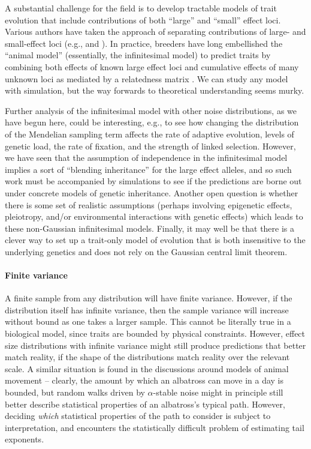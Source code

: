 \documentclass{article}
\newcommand{\1}{\mathbbm{1}}
\theoremstyle{remark}
\theoremstyle{definition}
\begin{document}
A substantial challenge for the field is to develop tractable models of trait evolution
that include contributions of both ``large'' and ``small'' effect loci.
Various authors have taken the approach of separating contributions of large- and small-effect loci
(e.g., \citet{lande1983response} and \citet{chevin2008selective}). 
In practice, breeders have long embellished the ``animal model'' (essentially, the infinitesimal model)
to predict traits
by combining both effects of known large effect loci
and cumulative effects of many unknown loci as mediated by a relatedness matrix
\citep[e.g.,][]{fernando1989marker,teissier2018weighted,bernardo2014genomewide,rice2019evaluation}.
We can study any model with simulation,
but the way forwards to theoretical understanding seems murky.

Further analysis of the infinitesimal model with other noise distributions,
as we have begun here,
could be interesting,
e.g., to see how changing the distribution of the Mendelian sampling term
affects the rate of adaptive evolution,
levels of genetic load,
the rate of fixation,
and the strength of linked selection.
However,
we have seen that the assumption of independence in the infinitesimal model
implies a sort of ``blending inheritance''
for the large effect alleles,
and so such work must be accompanied by simulations
to see if the predictions are borne out under concrete models of genetic inheritance.
Another open question is whether there is some set of realistic assumptions
(perhaps involving epigenetic effects, pleiotropy, and/or environmental interactions with genetic effects)
which leads to these non-Gaussian infinitesimal models.
Finally, it may well be that there is a clever way to set up a trait-only model of evolution
that is both insensitive to the underlying genetics
and does not rely on the Gaussian central limit theorem.

\paragraph{Finite variance}
A finite sample from any distribution will have finite variance.
However, if the distribution itself has infinite variance,
then the sample variance will increase without bound as one takes a larger sample.
This cannot be literally true in a biological model, since traits are bounded
by physical constraints.
However, effect size distributions with infinite variance
might still produce predictions that better match reality,
if the shape of the distributions match reality over the relevant scale.
A similar situation is found in the discussions around models of animal movement \citep{benhamou2007animals}
-- clearly, the amount by which an albatross can move in a day is bounded,
but random walks driven by $\alpha$-stable noise
might in principle still better describe statistical properties of an albatross's typical path.
However, deciding \emph{which} statistical properties of the path to consider
is subject to interpretation,
and encounters the statistically difficult problem of estimating tail exponents.
\end{document}
